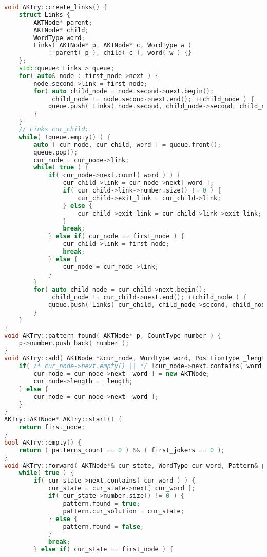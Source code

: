 \begin{lstlisting}[language=C++]
void AKTry::create_links() {
    struct Links {
        AKTNode* parent;
        AKTNode* child;
        WordType word;
        Links( AKTNode* p, AKTNode* c, WordType w )
            : parent( p ), child( c ), word( w ) {}
    };
    std::queue< Links > queue;
    for( auto& node : first_node->next ) {
        node.second->link = first_node;
        for( auto child_node = node.second->next.begin();
             child_node != node.second->next.end(); ++child_node ) {
            queue.push( Links( node.second, child_node->second, child_node->first ) );
        }
    }
    // Links cur_child;
    while( !queue.empty() ) {
        auto [ cur_node, cur_child, word ] = queue.front();
        queue.pop();
        cur_node = cur_node->link;
        while( true ) {
            if( cur_node->next.count( word ) ) {
                cur_child->link = cur_node->next[ word ];
                if( cur_child->link->number.size() != 0 ) {
                    cur_child->exit_link = cur_child->link;
                } else {
                    cur_child->exit_link = cur_child->link->exit_link;
                }
                break;
            } else if( cur_node == first_node ) {
                cur_child->link = first_node;
                break;
            } else {
                cur_node = cur_node->link;
            }
        }
        for( auto child_node = cur_child->next.begin();
             child_node != cur_child->next.end(); ++child_node ) {
            queue.push( Links( cur_child, child_node->second, child_node->first ) );
        }
    }
}
void AKTry::pattern_found( AKTNode* p, CountType number ) {
    p->number.push_back( number );
}
void AKTry::add( AKTNode *&cur_node, WordType word, PositionType _length ) {
    if( /* cur_node->next.empty() || */ !cur_node->next.contains( word ) ) {
        cur_node = cur_node->next[ word ] = new AKTNode;
        cur_node->length = _length;
    } else {
        cur_node = cur_node->next[ word ];
    }
}
AKTry::AKTNode* AKTry::start() {
    return first_node;
}
bool AKTry::empty() {
    return ( patterns_count == 0 ) && ( first_jokers == 0 );
}
void AKTry::forward( AKTNode*& cur_state, WordType cur_word, Pattern& pattern ) {
    while( true ) {
        if( cur_state->next.contains( cur_word ) ) {
            cur_state = cur_state->next[ cur_word ];
            if( cur_state->number.size() != 0 ) {
                pattern.found = true;
                pattern.cur_solution = cur_state;
            } else {
                pattern.found = false;
            }
            break;
        } else if( cur_state == first_node ) {

\end{lstlisting}

